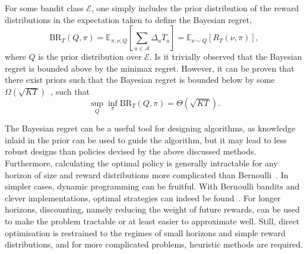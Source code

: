 For some bandit class $\mathcal{E}$, one simply includes the prior distribution of the reward distributions in the expectation taken to define the Bayesian regret,
\begin{equation}
    \text{BR}_T(Q, \pi)
    = \mathbb{E}_{\pi, \nu, Q} \left[ \sum_{a \in \mathcal{A}} \Delta_a T_a \right]
    = \mathbb{E}_{\nu \sim Q} \left[R_T(\nu, \pi) \right],
\end{equation}
where $Q$ is the prior distribution over $\mathcal{E}$.
Is it trivially observed that the Bayesian regret is bounded above by the minimax regret.
However, it can be proven that there exist priors such that the Bayesian regret is bounded below by some $\Omega(\sqrt{KT})$~\autocite{lattimore2020}, such that\footnotemark
\begin{equation}
    \sup_{Q} \inf_{\pi} \text{BR}_T(Q, \pi) = \Theta(\sqrt{KT}).
\end{equation}



The Bayesian regret can be a useful tool for designing algorithms, as knowledge inlaid in the prior can be used to guide the algorithm, but it may lead to less robust designs than policies devised by the above discussed methods.
Furthermore, calculating the optimal policy is generally intractable for any horizon of size and reward distributions more complicated than Bernoulli~\autocite{lattimore2020}.
In simpler cases, dynamic programming can be fruitful.
With Bernoulli bandits and clever implementations, optimal strategies can indeed be found~\autocite{pilarski2021}.
For longer horizons, discounting, namely reducing the weight of future rewards, can be used to make the problem tractable or at least easier to approximate well.
Still, direct optimisation is restrained to the regimes of small horizons and simple reward distributions, and for more complicated problems, heuristic methods are required.
